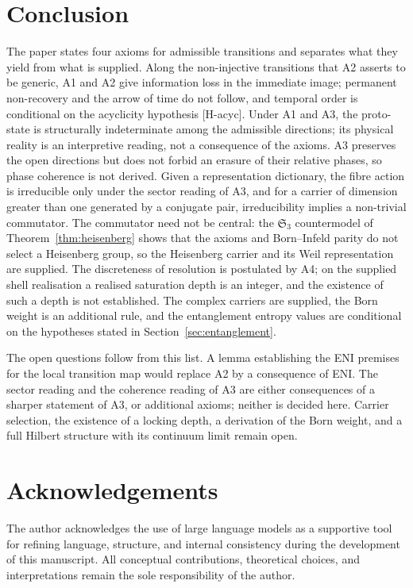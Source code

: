\documentclass[11pt,a4paper]{article}
\begin{document}
  \section{Conclusion}
  \label{sec:conclusion}

  The paper states four axioms for admissible transitions and separates what they yield from what is
  supplied.
  Along the non-injective transitions that A2 asserts to be generic, A1 and A2 give information loss in the
  immediate image; permanent non-recovery and the arrow of time do not follow, and temporal order is
  conditional on the acyclicity hypothesis [H-acyc].
  Under A1 and A3, the proto-state is structurally indeterminate among the admissible directions; its
  physical reality is an interpretive reading, not a consequence of the axioms.
  A3 preserves the open directions but does not forbid an erasure of their relative phases, so phase
  coherence is not derived.
  Given a representation dictionary, the fibre action is irreducible only under the sector reading of A3,
  and for a carrier of dimension greater than one generated by a conjugate pair, irreducibility implies a
  non-trivial commutator.
  The commutator need not be central: the $\mathfrak{S}_3$ countermodel of Theorem~\ref{thm:heisenberg}
  shows that the axioms and Born--Infeld parity do not select a Heisenberg group, so the Heisenberg carrier
  and its Weil representation are supplied.
  The discreteness of resolution is postulated by A4; on the supplied shell realisation a realised
  saturation depth is an integer, and the existence of such a depth is not established.
  The complex carriers are supplied, the Born weight is an additional rule, and the entanglement entropy
  values are conditional on the hypotheses stated in Section~\ref{sec:entanglement}.

  The open questions follow from this list.
  A lemma establishing the ENI premises for the local transition map would replace A2 by a consequence of
  ENI.
  The sector reading and the coherence reading of A3 are either consequences of a sharper statement of A3,
  or additional axioms; neither is decided here.
  Carrier selection, the existence of a locking depth, a derivation of the Born weight, and a full Hilbert
  structure with its continuum limit remain open.

    \clearpage
  \section*{Acknowledgements}

  The author acknowledges the use of large language models as a supportive tool
  for refining language, structure, and internal consistency during the development
  of this manuscript.
  All conceptual contributions, theoretical choices, and interpretations remain
  the sole responsibility of the author.

  
\end{document}
